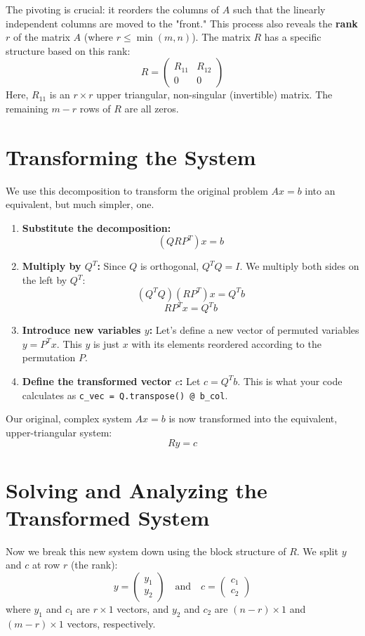 \documentclass[11pt, a4paper]{article}
\begin{document}
The pivoting is crucial: it reorders the columns of $A$ such that the linearly independent columns are moved to the "front." This process also reveals the \textbf{rank} $r$ of the matrix $A$ (where $r \le \min(m, n)$). The matrix $R$ has a specific structure based on this rank:
$$
R = \begin{pmatrix} R_{11} & R_{12} \\ 0 & 0 \end{pmatrix}
$$
Here, $R_{11}$ is an $r \times r$ upper triangular, non-singular (invertible) matrix. The remaining $m-r$ rows of $R$ are all zeros.

\section{Transforming the System}

We use this decomposition to transform the original problem $Ax = b$ into an equivalent, but much simpler, one.

\begin{enumerate}
    \item \textbf{Substitute the decomposition:}
    $$
    (QRP^T)x = b
    $$
    
    \item \textbf{Multiply by $Q^T$:} Since $Q$ is orthogonal, $Q^T Q = I$. We multiply both sides on the left by $Q^T$:
    $$
    (Q^T Q) (RP^T)x = Q^T b
    $$
    $$
    RP^T x = Q^T b
    $$
    
    \item \textbf{Introduce new variables $y$:} Let's define a new vector of permuted variables $y = P^T x$. This $y$ is just $x$ with its elements reordered according to the permutation $P$.
    
    \item \textbf{Define the transformed vector $c$:} Let $c = Q^T b$. This is what your code calculates as \texttt{c\_vec = Q.transpose() @ b\_col}.
\end{enumerate}

Our original, complex system $Ax = b$ is now transformed into the equivalent, upper-triangular system:
$$
Ry = c
$$

\section{Solving and Analyzing the Transformed System}

Now we break this new system down using the block structure of $R$. We split $y$ and $c$ at row $r$ (the rank):
$$
y = \begin{pmatrix} y_1 \\ y_2 \end{pmatrix}
\quad \text{and} \quad
c = \begin{pmatrix} c_1 \\ c_2 \end{pmatrix}
$$
where $y_1$ and $c_1$ are $r \times 1$ vectors, and $y_2$ and $c_2$ are $(n-r) \times 1$ and $(m-r) \times 1$ vectors, respectively.
\end{document}
